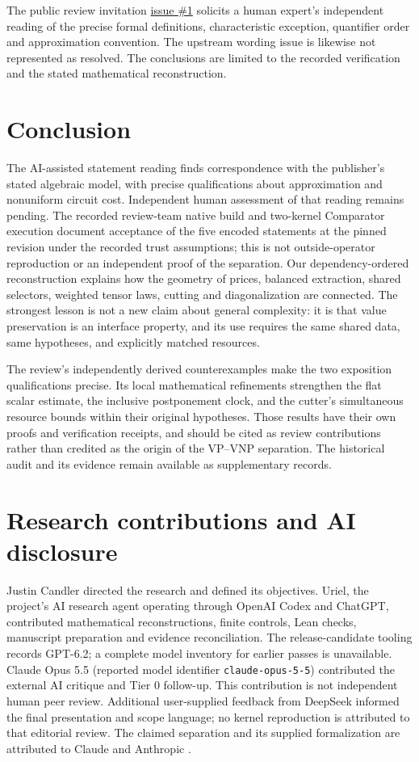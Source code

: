 \documentclass[11pt,letterpaper]{article}
\theoremstyle{definition}\newtheorem{definition}[theorem]{Definition}\newtheorem{example}[theorem]{Example}
\theoremstyle{remark}\newtheorem{remark}[theorem]{Remark}
\begin{document}
The public review invitation \href{https://github.com/nousentllc/VP-VNP-Review/issues/1}{issue \#1} solicits a human expert's independent reading of the precise formal definitions, characteristic exception, quantifier order and approximation convention. The upstream wording issue is likewise not represented as resolved. The conclusions are limited to the recorded verification and the stated mathematical reconstruction.

\section{Conclusion}\label{sec:conclusion}
The AI-assisted statement reading finds correspondence with the publisher's stated algebraic model, with precise qualifications about approximation and nonuniform circuit cost. Independent human assessment of that reading remains pending. The recorded review-team native build and two-kernel Comparator execution document acceptance of the five encoded statements at the pinned revision under the recorded trust assumptions; this is not outside-operator reproduction or an independent proof of the separation. Our dependency-ordered reconstruction explains how the geometry of prices, balanced extraction, shared selectors, weighted tensor laws, cutting and diagonalization are connected. The strongest lesson is not a new claim about general complexity: it is that value preservation is an interface property, and its use requires the same shared data, same hypotheses, and explicitly matched resources.

The review's independently derived counterexamples make the two exposition qualifications precise. Its local mathematical refinements strengthen the flat scalar estimate, the inclusive postponement clock, and the cutter's simultaneous resource bounds within their original hypotheses. Those results have their own proofs and verification receipts, and should be cited as review contributions rather than credited as the origin of the VP--VNP separation. The historical audit and its evidence remain available as supplementary records.

\section*{Research contributions and AI disclosure}
Justin Candler directed the research and defined its objectives. Uriel, the project's AI research agent operating through OpenAI Codex and ChatGPT, contributed mathematical reconstructions, finite controls, Lean checks, manuscript preparation and evidence reconciliation. The release-candidate tooling records GPT-6.2; a complete model inventory for earlier passes is unavailable. Claude Opus 5.5 (reported model identifier \texttt{claude-opus-5-5}) contributed the external AI critique and Tier 0 follow-up. This contribution is not independent human peer review. Additional user-supplied feedback from DeepSeek informed the final presentation and scope language; no kernel reproduction is attributed to that editorial review. The claimed separation and its supplied formalization are attributed to Claude and Anthropic \cite{claude}.
\end{document}
